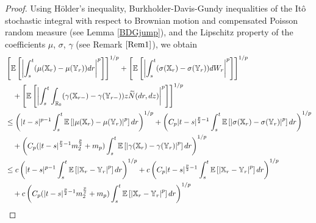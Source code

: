 \documentclass[11pt]{article}
\theoremstyle{theorem}
\theoremstyle{definition}
\newcommand{\bR}{\mathbb{R}}
\newcommand{\1}{{\bf 1}}
\begin{document}
\begin{proof}
    Using H\"older's inequality, Burkholder-Davis-Gundy inequalities of the It\^o stochastic integral with respect to Brownian motion and compensated Poisson random measure (see Lemma \ref{BDGjump}), and the Lipschitz property of the coefficients $\mu$, $\sigma$, $\gamma$ (see  Remark $\ref{Rem1}$), we obtain
\begin{align*} 
 &\left[\mathbb{E} \left[\left| \int_s^t (\mu(\mathbb{X}_r)-\mu(\mathbb{Y}_r)) dr \right|^p \right]\right]^{1/p} + \left[\mathbb{E} \left[\left| \int_s^t (\sigma(\mathbb{X}_r)-\sigma(\mathbb{Y}_r)) dW_r \right|^p \right]\right]^{1/p}  \\
 & \quad + \left[\mathbb{E} \left[ \left| \int_s^t \int_{\bR_0} (\gamma(\mathbb{X}_{r-})-\gamma(\mathbb{Y}_{r-})) z \widetilde{N}(dr, dz) \right|^p \right]\right]^{1/p} \notag \\
& \le \left( |t-s|^{p-1} \int_s^t \mathbb{E} \left[ \left| \mu(\mathbb{X}_r)-\mu(\mathbb{Y}_r) \right|^p\right] dr \right)^{1/p} + \left( C_{p} |t-s|^{\frac{p}{2}-1} \int_s^t \mathbb{E} \left[ \left| \sigma(\mathbb{X}_r)-\sigma(\mathbb{Y}_r) \right|^p\right] dr \right)^{1/p} \notag\\
& \quad  + \left( C_{p} (|t-s|^{\frac{p}{2}-1}m_2^{\frac{p}{2}}+m_p ) \int_s^t \mathbb{E} \left[ \left| \gamma( \mathbb{X}_r) - \gamma (\mathbb{Y}_r) \right|^p\right] dr \right)^{1/p} \notag\\
& \le c \left( |t-s|^{p-1} \int_s^t \mathbb{E} \left[ \left| \mathbb{X}_r-\mathbb{Y}_r \right|^p\right] dr \right)^{1/p} + c \left( C_{p} |t-s|^{\frac{p}{2}-1} \int_s^t \mathbb{E} \left[ \left| \mathbb{X}_r-\mathbb{Y}_r \right|^p\right] dr \right)^{1/p} \notag\\
& \quad  + c \left( C_{p} (|t-s|^{\frac{p}{2}-1}m_2^{\frac{p}{2}}+m_p ) \int_s^t \mathbb{E} \left[ \left|  \mathbb{X}_r - \mathbb{Y}_r \right|^p\right] dr \right)^{1/p} \notag\\

\end{align*}
\end{proof}
\end{document}
